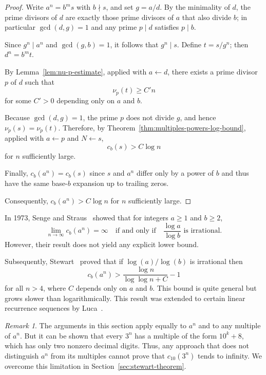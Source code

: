 \documentclass[12pt]{amsart}
\theoremstyle{remark}
\newtheorem*{remark}{Remark}
\begin{document}
\begin{proof}
    Write $a^n = b^m s$ with $b \nmid s$, and set $g = a/d$.
    By the minimality of $d$, the prime divisors of $d$ are exactly
    those prime divisors of $a$ that also divide $b$;
    in particular $\gcd(d, g) = 1$ and any prime $p \mid d$ satisfies $p \mid b$.

    Since $g^n \mid a^n$ and $\gcd(g, b) = 1$, it follows that $g^n \mid s$.
    Define $t = s / g^n$; then $d^n = b^m t$.

    By Lemma~\ref{lem:nu-p-estimate}, applied with $a \gets d$,
    there exists a prime divisor $p$ of $d$ such that
    \[
        \nu_p(t) \ge C' n
    \]
    for some $C' > 0$ depending only on $a$ and $b$.

    Because $\gcd(d, g) = 1$, the prime $p$ does not divide $g$,
    and hence $\nu_p(s) = \nu_p(t)$.
    Therefore, by Theorem~\ref{thm:multiples-powers-log-bound}, applied with $a \gets p$ and $N \gets s$,
    \[
        c_b(s) > C \log n
    \]
    for $n$ sufficiently large.

    Finally, $c_b(a^n) = c_b(s)$
    since $s$ and $a^n$ differ only by a power of $b$
    and thus have the same base-$b$ expansion up to trailing zeros.

    Consequently, $c_b(a^n) > C \log n$ for $n$ sufficiently large.
\end{proof}

In 1973, Senge and Straus~\cite[Theorem 3]{senge-straus1973}
showed that for integers $a \ge 1$ and $b \ge 2$,
\[
    \lim_{n \to \infty} c_b(a^n) = \infty
    \quad\text{if and only if}\quad
    \frac{\log a}{\log b} \text{ is irrational}.
\]
However, their result does not yield any explicit lower bound.

Subsequently, Stewart~\cite[Theorem 2]{stewart1980} proved
that if $\log(a)/\log(b)$ is irrational then
\[
    c_b(a^n) > \frac{\log n}{\log\log n + C} - 1
\]
for all $n>4$, where $C$ depends only on $a$ and $b$.
This bound is quite general but grows slower than logarithmically.
This result was extended to certain linear recurrence sequences
by Luca~\cite{luca2000}.

\begin{remark}
    The arguments in this section apply equally to $a^n$ and to any multiple of $a^n$.
    But it can be shown that every $3^n$ has a multiple of the form $10^k+8$,
    which has only two nonzero decimal digits.
    Thus, any approach that does not distinguish $a^n$ from its multiples cannot
    prove that $c_{10}(3^n)$ tends to infinity.
    We overcome this limitation in Section~\ref{sec:stewart-theorem}.
\end{remark}
\end{document}
